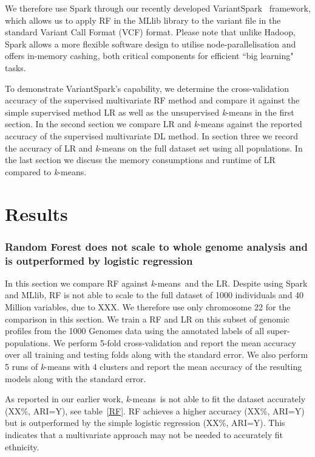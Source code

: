 \documentclass{llncs}
\newcommand{\variantSpark}{{\sc VariantSpark}}
\newcommand{\kMeans}{\textit{k}-means}
\begin{document}
{We therefore use {\sc Spark} through our recently developed \variantSpark~\cite{OBrien} framework, which allows us to apply RF in the {\sc MLlib} library to the variant file in the standard Variant Call Format (VCF) format. 
Please note that unlike {\sc Hadoop}, {\sc Spark} allows a more flexible software design to utilise node-parallelisation and offers in-memory cashing, both critical components for efficient ``big learning" tasks. 

To demonstrate \variantSpark's capability, we determine the cross-validation accuracy of the supervised multivariate RF method and compare it against the simple supervised method LR as well as the unsupervised \kMeans{} in the first section.
In the second section we compare LR and \kMeans{} against the reported accuracy of the supervised multivariate DL method.
In section three we record the accuracy of LR and \kMeans{} on the full dataset set using all populations. 
In the last section we discuss the memory consumptions and runtime of LR compared to \kMeans{}.


\section{Results}

\subsubsection{Random Forest does not scale to whole genome analysis and is outperformed by logistic regression}
In this section we compare RF against \kMeans\ and the LR.
Despite using {\sc Spark} and {\sc MLlib}, RF is not able to scale to the full dataset of 1000 individuals and 40 Million variables, due to XXX. 
We therefore use only chromosome 22 for the comparison in this section.
We train a RF and LR on this subset of genomic profiles from the 1000 Genomes data using the annotated labels of all super-populations.
We perform 5-fold cross-validation and report the mean accuracy over all training and testing folds along with the standard error.
We also perform 5 runs of \kMeans{} with 4 clusters and report the mean accuracy of the resulting models along with the standard error. 

As reported in our earlier work, \kMeans\ is not able to fit the dataset accurately (XX\%, ARI=Y), see table~\ref{RF}.
RF achieves a higher accuracy (XX\%, ARI=Y) but is outperformed by the simple logistic regression (XX\%, ARI=Y).
This indicates that a multivariate approach may not be needed to accurately fit ethnicity. 


}
\end{document}
